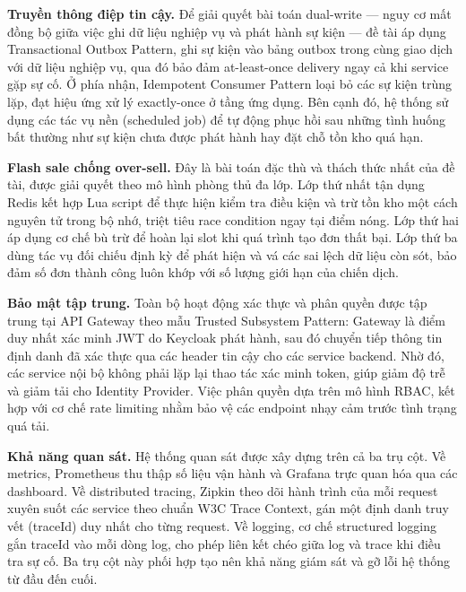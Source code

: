 \documentclass[../DoAn.tex]{subfiles}
\begin{document}
\textbf{Truyền thông điệp tin cậy.} Để giải quyết bài toán dual-write --- nguy cơ mất đồng
bộ giữa việc ghi dữ liệu nghiệp vụ và phát hành sự kiện --- đề tài áp dụng Transactional
Outbox Pattern, ghi sự kiện vào bảng outbox trong cùng giao dịch với dữ liệu nghiệp vụ, qua
đó bảo đảm at-least-once delivery ngay cả khi service gặp sự cố. Ở phía nhận, Idempotent
Consumer Pattern loại bỏ các sự kiện trùng lặp, đạt hiệu ứng xử lý exactly-once ở tầng ứng
dụng. Bên cạnh đó, hệ thống sử dụng các tác vụ nền (scheduled job) để tự động phục hồi sau
những tình huống bất thường như sự kiện chưa được phát hành hay đặt chỗ tồn kho quá hạn.

\textbf{Flash sale chống over-sell.} Đây là bài toán đặc thù và thách thức nhất của đề tài,
được giải quyết theo mô hình phòng thủ đa lớp. Lớp thứ nhất tận dụng Redis kết hợp Lua script
để thực hiện kiểm tra điều kiện và trừ tồn kho một cách nguyên tử trong bộ nhớ, triệt tiêu
race condition ngay tại điểm nóng. Lớp thứ hai áp dụng cơ chế bù trừ để hoàn lại slot khi quá
trình tạo đơn thất bại. Lớp thứ ba dùng tác vụ đối chiếu định kỳ để phát hiện và vá các sai
lệch dữ liệu còn sót, bảo đảm số đơn thành công luôn khớp với số lượng giới hạn của chiến dịch.

\textbf{Bảo mật tập trung.} Toàn bộ hoạt động xác thực và phân quyền được tập trung tại API
Gateway theo mẫu Trusted Subsystem Pattern: Gateway là điểm duy nhất xác minh JWT do Keycloak
phát hành, sau đó chuyển tiếp thông tin định danh đã xác thực qua các header tin cậy cho các
service backend. Nhờ đó, các service nội bộ không phải lặp lại thao tác xác minh token, giúp
giảm độ trễ và giảm tải cho Identity Provider. Việc phân quyền dựa trên mô hình RBAC, kết hợp
với cơ chế rate limiting nhằm bảo vệ các endpoint nhạy cảm trước tình trạng quá tải.

\textbf{Khả năng quan sát.} Hệ thống quan sát được xây dựng trên cả ba trụ cột. Về metrics,
Prometheus thu thập số liệu vận hành và Grafana trực quan hóa qua các dashboard. Về
distributed tracing, Zipkin theo dõi hành trình của mỗi request xuyên suốt các service theo
chuẩn W3C Trace Context, gán một định danh truy vết (traceId) duy nhất cho từng request. Về
logging, cơ chế structured logging gắn traceId vào mỗi dòng log, cho phép liên kết chéo giữa
log và trace khi điều tra sự cố. Ba trụ cột này phối hợp tạo nên khả năng giám sát và gỡ lỗi
hệ thống từ đầu đến cuối.
\end{document}
